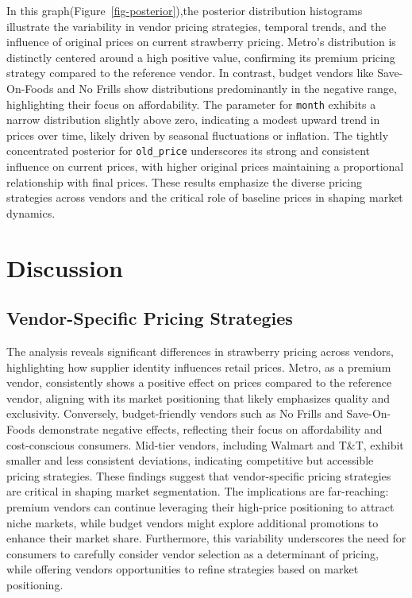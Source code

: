\documentclass[
  letterpaper,
  DIV=11,
  numbers=noendperiod]{scrartcl}
\begin{document}
In this graph(Figure~\ref{fig-posterior}),the posterior distribution
histograms illustrate the variability in vendor pricing strategies,
temporal trends, and the influence of original prices on current
strawberry pricing. Metro's distribution is distinctly centered around a
high positive value, confirming its premium pricing strategy compared to
the reference vendor. In contrast, budget vendors like Save-On-Foods and
No Frills show distributions predominantly in the negative range,
highlighting their focus on affordability. The parameter for
\texttt{month} exhibits a narrow distribution slightly above zero,
indicating a modest upward trend in prices over time, likely driven by
seasonal fluctuations or inflation. The tightly concentrated posterior
for \texttt{old\_price} underscores its strong and consistent influence
on current prices, with higher original prices maintaining a
proportional relationship with final prices. These results emphasize the
diverse pricing strategies across vendors and the critical role of
baseline prices in shaping market dynamics.

\section{Discussion}\label{sec-discussion}

\subsection{Vendor-Specific Pricing
Strategies}\label{vendor-specific-pricing-strategies}

The analysis reveals significant differences in strawberry pricing
across vendors, highlighting how supplier identity influences retail
prices. Metro, as a premium vendor, consistently shows a positive effect
on prices compared to the reference vendor, aligning with its market
positioning that likely emphasizes quality and exclusivity. Conversely,
budget-friendly vendors such as No Frills and Save-On-Foods demonstrate
negative effects, reflecting their focus on affordability and
cost-conscious consumers. Mid-tier vendors, including Walmart and T\&T,
exhibit smaller and less consistent deviations, indicating competitive
but accessible pricing strategies. These findings suggest that
vendor-specific pricing strategies are critical in shaping market
segmentation. The implications are far-reaching: premium vendors can
continue leveraging their high-price positioning to attract niche
markets, while budget vendors might explore additional promotions to
enhance their market share. Furthermore, this variability underscores
the need for consumers to carefully consider vendor selection as a
determinant of pricing, while offering vendors opportunities to refine
strategies based on market positioning.
\end{document}
